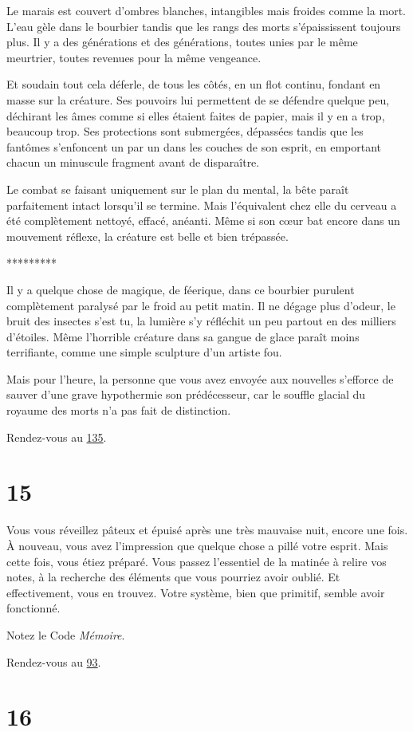 \documentclass{report}
\newcommand{\gsection}[1]{
    \section{#1}
    \label{section-#1}
}
\newcommand{\glink}[1]{\hyperref[section-#1]{#1}}
\newcommand{\ellipse}{
    \begin{center}
        *********
    \end{center}
}
\begin{document}
Le marais est couvert d'ombres blanches, intangibles mais froides comme la mort. L'eau gèle dans le bourbier tandis que les rangs des morts s'épaississent toujours plus. Il y a des générations et des générations, toutes unies par le même meurtrier, toutes revenues pour la même vengeance.

Et soudain tout cela déferle, de tous les côtés, en un flot continu, fondant en masse sur la créature. Ses pouvoirs lui permettent de se défendre quelque peu, déchirant les âmes comme si elles étaient faites de papier, mais il y en a trop, beaucoup trop. Ses protections sont submergées, dépassées tandis que les fantômes s'enfoncent un par un dans les couches de son esprit, en emportant chacun un minuscule fragment avant de disparaître.

Le combat se faisant uniquement sur le plan du mental, la bête paraît parfaitement intact lorsqu'il se termine. Mais l'équivalent chez elle du cerveau a été complètement nettoyé, effacé, anéanti. Même si son cœur bat encore dans un mouvement réflexe, la créature est belle et bien trépassée.

\ellipse

Il y a quelque chose de magique, de féerique, dans ce bourbier purulent complètement paralysé par le froid au petit matin. Il ne dégage plus d'odeur, le bruit des insectes s'est tu, la lumière s'y réfléchit un peu partout en des milliers d'étoiles. Même l’horrible créature dans sa gangue de glace paraît moins terrifiante, comme une simple sculpture d'un artiste fou.

Mais pour l'heure, la personne que vous avez envoyée aux nouvelles s'efforce de sauver d'une grave hypothermie son prédécesseur, car le souffle glacial du royaume des morts n'a pas fait de distinction.

Rendez-vous au \glink{135}.

\gsection{15}

Vous vous réveillez pâteux et épuisé après une très mauvaise nuit, encore une fois. À nouveau, vous avez l'impression que quelque chose a pillé votre esprit. Mais cette fois, vous étiez préparé. Vous passez l'essentiel de la matinée à relire vos notes, à la recherche des éléments que vous pourriez avoir oublié. Et effectivement, vous en trouvez. Votre système, bien que primitif, semble avoir fonctionné.

Notez le Code \emph{Mémoire}.

Rendez-vous au \glink{93}.

\gsection{16}
\end{document}

